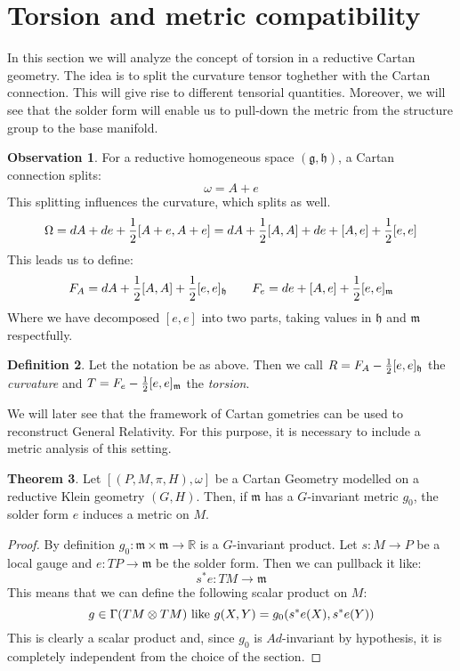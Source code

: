 \documentclass[12pt,a4paper]{report}
\theoremstyle{definition}
\newtheorem{Def}{Definition}[chapter]
\theoremstyle{Theorem}
\newtheorem{Theo}[Def]{Theorem}
\theoremstyle{definition}
\theoremstyle{definition}
\newtheorem{Obs}[Def]{Observation}
\begin{document}
	\section{Torsion and metric compatibility}
	In this section we will analyze the concept of torsion in a reductive Cartan geometry. The idea is to split the curvature tensor toghether with the Cartan connection. This will give rise to different tensorial quantities. Moreover, we will see that the solder form will enable us to pull-down the metric from the structure group to the base manifold. 
	\begin{Obs}
		For a reductive homogeneous space $(\mathfrak{g},\mathfrak{h})$, a Cartan connection splits:
		$$\omega=A+e$$
		This splitting influences the curvature, which splits as well.
		$$\Omega=dA+de+{1\over 2}[A+e,A+e]=dA+{1\over 2}[A,A]+de+[A,e]+{1\over 2}[e,e]$$
		This leads us to define:
		$$F_A=dA+{1\over 2}[A,A]+{1\over 2}[e,e]_{\mathfrak{h}}\hspace{20 pt}F_e=de+[A,e]+{1\over 2}[e,e]_{\mathfrak{m}}$$
		Where we have decomposed $[e,e]$ into two parts, taking values in $\mathfrak{h}$ and $\mathfrak{m}$ respectfully.
	\end{Obs}
	\begin{Def}
		Let the notation be as above. Then we call $R=F_A-{1\over 2}[e,e]_\mathfrak{h}$ the \textit{curvature }and $T=F_e-{1\over 2}[e,e]_\mathfrak{m}$ the \textit{torsion}. 
	\end{Def}
	We will later see that the framework of Cartan gometries can be used to reconstruct General Relativity. For this purpose, it is necessary to include a metric analysis of this setting.
	\begin{Theo}
		Let $[(P,M,\pi,H),\omega]$ be a Cartan Geometry modelled on a reductive Klein geometry $(G,H)$. Then, if $\mathfrak{m}$ has a $G$-invariant metric $g_0$, the solder form $e$ induces a metric on $M$. 
	\end{Theo}
	\begin{proof}
		By definition $g_0:\mathfrak{m}\times \mathfrak{m}\rightarrow \mathbb{R}$ is a $G$-invariant product. Let $s:M\rightarrow P$ be a local gauge and $e:TP\rightarrow \mathfrak{m}$ be the solder form. Then we can pullback it like:
		$$s^*e:TM\rightarrow \mathfrak{m}$$
		This means that we can define the following scalar product on $M$:
		$$g\in\Gamma(TM\otimes TM)\hbox{ like }g(X,Y)=g_0(s^*e(X),s^*e(Y))$$
		This is clearly a scalar product and, since $g_0$ is $Ad$-invariant by hypothesis, it is completely independent from the choice of the section.
	\end{proof}
\end{document}
